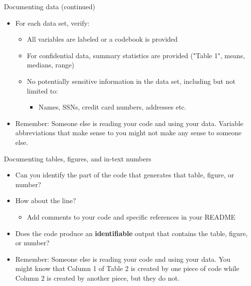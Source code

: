 \documentclass[xcolor={dvipsnames}]{beamer}
\theoremstyle{definition}
\begin{document}
\begin{frame}{Documenting data (continued)}
\begin{itemize}
    \item For each data set, verify:
    \begin{itemize}
        \item All variables are labeled or a codebook is provided
        \item For confidential data, summary statistics are provided ("Table 1", means, medians, range)
        \item No potentially sensitive information in the data set, including but not limited to:
        \begin{itemize}
            \item Names, SSNs, credit card numbers, addresses etc.
        \end{itemize}
    \end{itemize}
    \item Remember: Someone else is reading your code and using your data. Variable abbreviations that make sense to you might not make any sense to someone else.
\end{itemize}
\end{frame}

\begin{frame}{Documenting tables, figures, and in-text numbers}
\begin{itemize}
    \item Can you identify the part of the code that generates that table, figure, or number?
    \pause
    \item How about the line?
    \pause 
    \begin{itemize}
        \item Add comments to your code and specific references in your README
    \end{itemize}
    \pause
    \item Does the code produce an \textbf{identifiable} output that contains the table, figure, or number?
    \item Remember: Someone else is reading your code and using your data. You might know that Column 1 of Table 2 is created by one piece of code while Column 2 is created by another piece, but they do not.
\end{itemize}
\end{frame}
\end{document}
